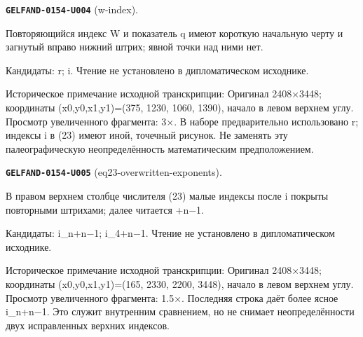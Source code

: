 \par\noindent\leavevmode{}\label{GELFAND-0154-U004}\textbf{\texttt{GELFAND-0154-U004}} (w-index).\nopagebreak[4]\par
Повторяющийся индекс W и показатель q имеют короткую начальную черту и загнутый вправо нижний штрих; явной точки над ними нет.\par
Кандидаты: r; i. Чтение не установлено в дипломатическом исходнике.\par
Историческое примечание исходной транскрипции: Оригинал 2408×3448; координаты (x0,y0,x1,y1)=(375, 1230, 1060, 1390), начало в левом верхнем углу. Просмотр увеличенного фрагмента: 3×. В наборе предварительно использовано r; индексы i в (23) имеют иной, точечный рисунок. Не заменять эту палеографическую неопределённость математическим предположением.\par\medskip
\par\noindent\leavevmode{}\label{GELFAND-0154-U005}\textbf{\texttt{GELFAND-0154-U005}} (eq23-overwritten-exponents).\nopagebreak[4]\par
В правом верхнем столбце числителя (23) малые индексы после i покрыты повторными штрихами; далее читается +n−1.\par
Кандидаты: i\_n+n−1; i\_4+n−1. Чтение не установлено в дипломатическом исходнике.\par
Историческое примечание исходной транскрипции: Оригинал 2408×3448; координаты (x0,y0,x1,y1)=(165, 2330, 2200, 3448), начало в левом верхнем углу. Просмотр увеличенного фрагмента: 1.5×. Последняя строка даёт более ясное i\_n+n−1. Это служит внутренним сравнением, но не снимает неопределённости двух исправленных верхних индексов.\par\medskip
